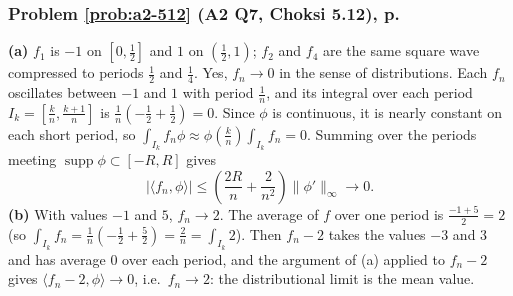 \documentclass{article}
\newcommand{\ip}[2]{\langle #1, #2 \rangle}
\begin{document}
\label{sol:a2-512}
\subsubsection*{Problem \ref{prob:a2-512} (A2 Q7, Choksi 5.12), p.~\pageref{prob:a2-512}}
\textbf{(a)} $f_1$ is $-1$ on $[0,\frac12]$ and $1$ on $(\frac12,1)$; $f_2$ and $f_4$ are the same square wave compressed to periods $\frac12$ and $\frac14$. Yes, $f_n \to 0$ in the sense of distributions. Each $f_n$ oscillates between $-1$ and $1$ with period $\frac1n$, and its integral over each period $I_k = [\frac kn, \frac{k+1}{n}]$ is $\frac1n(-\frac12 + \frac12) = 0$. Since $\phi$ is continuous, it is nearly constant on each short period, so $\int_{I_k}f_n\phi \approx \phi(\frac kn)\int_{I_k}f_n = 0$. Summing over the periods meeting $\operatorname{supp}\phi \subset [-R,R]$ gives
\begin{equation*}
    |\ip{f_n}{\phi}| \leq \left(\frac{2R}{n} + \frac{2}{n^2}\right)\|\phi'\|_\infty \to 0.
\end{equation*}
\textbf{(b)} With values $-1$ and $5$, $f_n \to 2$. The average of $f$ over one period is $\frac{-1+5}{2} = 2$ (so $\int_{I_k}f_n = \frac1n(-\frac12 + \frac52) = \frac2n = \int_{I_k}2$). Then $f_n - 2$ takes the values $-3$ and $3$ and has average $0$ over each period, and the argument of (a) applied to $f_n - 2$ gives $\ip{f_n - 2}{\phi} \to 0$, i.e.\ $f_n \to 2$: the distributional limit is the mean value.

\label{sol:a2-514}
\end{document}

